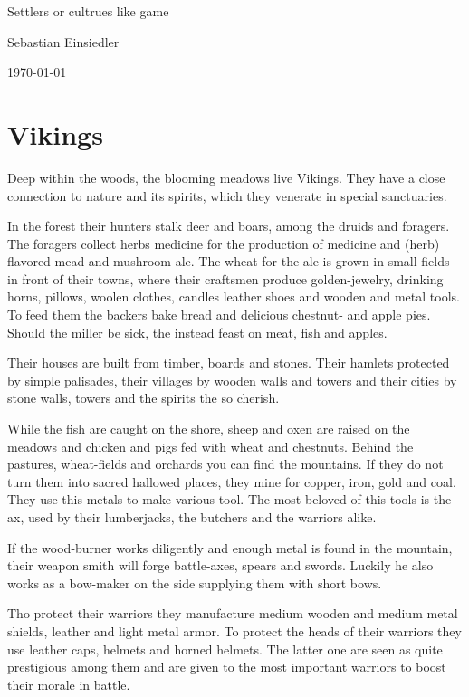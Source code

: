 \documentclass[a4paper]{article}
\newcommand{\Author}{Sebastian Einsiedler}
\newcommand{\Title}{Settlers or cultrues like game}
\begin{document}
\begin{center}
	\begin{large}
		\Title
	\end{large}

\Author

\today
\end{center}

\section{\Gls{Vikings}}

	Deep within the woods, the blooming meadows live \gls{Vikings}.
	They have a close connection to nature and its spirits,
	which they venerate in special sanctuaries.

	In the forest their hunters stalk deer and boars,
	among the druids and foragers.
	The foragers collect herbs medicine for the production
	of medicine and (herb) flavored mead and mushroom ale.
	The wheat for the ale is grown in small fields in front of their towns,
	where their craftsmen produce golden-jewelry, drinking horns, pillows,
	woolen clothes, candles leather shoes and wooden and metal tools.
	To feed them the backers bake bread and delicious chestnut- and apple pies.
	Should the miller be sick, the instead feast on meat, fish and apples.

	Their houses are built from timber, boards and stones.
	Their hamlets protected by simple palisades,
	their villages by wooden walls and towers and their cities by stone walls, towers
	and the spirits the so cherish.

	While the fish are caught on the shore, sheep and oxen
	are raised on the meadows and chicken and pigs fed with wheat and chestnuts.
	Behind the pastures, wheat-fields and orchards you can find the mountains.
	If they do not turn them into sacred hallowed places,
	they mine for copper, iron, gold and coal.
	They use this metals to make various tool.
	The most beloved of this tools is the ax, used by their lumberjacks,
	the butchers and the warriors alike.

	If the wood-burner works diligently and enough metal is found in the mountain,
	their weapon smith will forge battle-axes, spears and swords.
	Luckily he also works as a bow-maker on the side supplying them with short bows.

	Tho protect their warriors they manufacture medium wooden and medium metal shields,
	leather and light metal armor.
	To protect the heads of their warriors they use leather caps, helmets and horned helmets.
	The latter one are seen as quite prestigious among them and are given to the most important
	warriors to boost their morale in battle.
\end{document}
